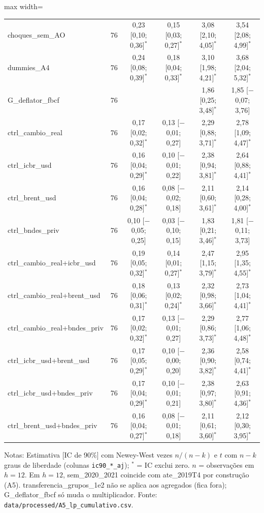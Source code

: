 \begin{table}[htbp]
\begin{adjustbox}{max width=\linewidth}
\begin{tabular}{lccccc}
choques\_sem\_AO & 76 & 0{,}23 [0{,}10; 0{,}36]$^{*}$ & 0{,}15 [0{,}03; 0{,}27]$^{*}$ & 3{,}08 [2{,}10; 4{,}05]$^{*}$ & 3{,}54 [2{,}08; 4{,}99]$^{*}$ \\
dummies\_A4 & 76 & 0{,}24 [0{,}08; 0{,}39]$^{*}$ & 0{,}18 [0{,}04; 0{,}33]$^{*}$ & 3{,}10 [1{,}98; 4{,}21]$^{*}$ & 3{,}68 [2{,}04; 5{,}32]$^{*}$ \\
G\_deflator\_fbcf & 76 &  &  & 1{,}86 [0{,}25; 3{,}48]$^{*}$ & 1{,}85 [$-$0{,}07; 3{,}76] \\
ctrl\_cambio\_real & 76 & 0{,}17 [0{,}02; 0{,}32]$^{*}$ & 0{,}13 [$-$0{,}01; 0{,}27] & 2{,}29 [0{,}88; 3{,}71]$^{*}$ & 2{,}78 [1{,}09; 4{,}47]$^{*}$ \\
ctrl\_icbr\_usd & 76 & 0{,}16 [0{,}04; 0{,}29]$^{*}$ & 0{,}10 [$-$0{,}01; 0{,}22] & 2{,}38 [0{,}94; 3{,}81]$^{*}$ & 2{,}64 [0{,}88; 4{,}41]$^{*}$ \\
ctrl\_brent\_usd & 76 & 0{,}16 [0{,}04; 0{,}28]$^{*}$ & 0{,}08 [$-$0{,}02; 0{,}18] & 2{,}11 [0{,}60; 3{,}61]$^{*}$ & 2{,}14 [0{,}28; 4{,}00]$^{*}$ \\
ctrl\_bndes\_priv & 76 & 0{,}10 [$-$0{,}05; 0{,}25] & 0{,}03 [$-$0{,}10; 0{,}15] & 1{,}83 [0{,}21; 3{,}46]$^{*}$ & 1{,}81 [$-$0{,}11; 3{,}73] \\
ctrl\_cambio\_real+icbr\_usd & 76 & 0{,}19 [0{,}05; 0{,}32]$^{*}$ & 0{,}14 [0{,}01; 0{,}27]$^{*}$ & 2{,}47 [1{,}15; 3{,}79]$^{*}$ & 2{,}95 [1{,}35; 4{,}55]$^{*}$ \\
ctrl\_cambio\_real+brent\_usd & 76 & 0{,}18 [0{,}06; 0{,}31]$^{*}$ & 0{,}13 [0{,}02; 0{,}24]$^{*}$ & 2{,}32 [0{,}98; 3{,}66]$^{*}$ & 2{,}73 [1{,}04; 4{,}41]$^{*}$ \\
ctrl\_cambio\_real+bndes\_priv & 76 & 0{,}17 [0{,}02; 0{,}32]$^{*}$ & 0{,}13 [$-$0{,}01; 0{,}27] & 2{,}29 [0{,}86; 3{,}73]$^{*}$ & 2{,}77 [1{,}06; 4{,}48]$^{*}$ \\
ctrl\_icbr\_usd+brent\_usd & 76 & 0{,}17 [0{,}05; 0{,}29]$^{*}$ & 0{,}10 [$-$0{,}00; 0{,}20] & 2{,}36 [0{,}90; 3{,}82]$^{*}$ & 2{,}58 [0{,}74; 4{,}41]$^{*}$ \\
ctrl\_icbr\_usd+bndes\_priv & 76 & 0{,}17 [0{,}04; 0{,}29]$^{*}$ & 0{,}10 [$-$0{,}01; 0{,}21] & 2{,}38 [0{,}97; 3{,}80]$^{*}$ & 2{,}63 [0{,}91; 4{,}36]$^{*}$ \\
ctrl\_brent\_usd+bndes\_priv & 76 & 0{,}16 [0{,}04; 0{,}27]$^{*}$ & 0{,}08 [$-$0{,}01; 0{,}18] & 2{,}11 [0{,}61; 3{,}60]$^{*}$ & 2{,}12 [0{,}30; 3{,}95]$^{*}$ \\
\bottomrule
\end{tabular}
\end{adjustbox}
\begin{minipage}{0.97\linewidth}\footnotesize
\medskip Notas: Estimativa [IC de 90\%] com Newey-West vezes $n/(n-k)$ e $t$ com $n - k$ graus de liberdade (colunas \texttt{ic90\_*\_aj}); $^{*}$ = IC exclui zero. $n$ = observa\c{c}\~oes em $h = 12$. Em $h = 12$, sem\_2020\_2021 coincide com ate\_2019T4 por constru\c{c}\~ao (A5). transferencia\_grupos\_1e2 n\~ao se aplica aos agregados (fica fora); G\_deflator\_fbcf s\'o muda o multiplicador. Fonte: \texttt{data/processed/A5\_lp\_cumulativo.csv}.
\end{minipage}
\end{table}

